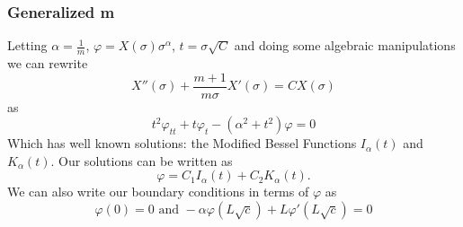 	




	
	
	
	
	\begin{frame}
	\frametitle{Generalized m}
		 Letting $\alpha=\frac 1m$, $\varphi=X(\sigma)\sigma ^\alpha$, $t=\sigma \sqrt{C}$ and doing some algebraic manipulations we can rewrite 
		\[X''(\sigma)+\frac{m+1}{m\sigma}X'(\sigma)=C X(\sigma)\]
		as
		\[t^2 \varphi_{tt}+t \varphi_t-(\alpha^2+t^2)\varphi=0\]
		Which has well known solutions: the Modified Bessel Functions $I_\alpha(t)$ and $K_\alpha(t)$. Our solutions can be written as $$\varphi=C_1I_\alpha(t)+C_2K_\alpha(t).$$ We can also write our boundary conditions in terms of $\varphi$ as 
		\[\varphi(0)=0\text{ and }-\alpha\varphi(L\sqrt{c})+L\varphi'(L\sqrt{c})=0\]
	\end{frame}
	
